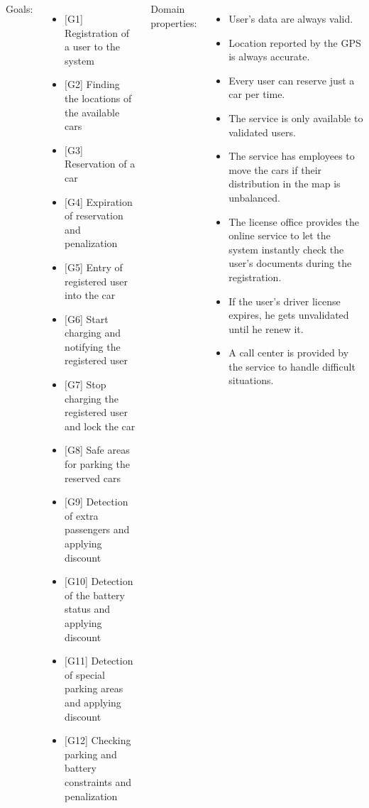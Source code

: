\begin{frame}
	\fontsize{7.5}{9}
	\begin{columns}[c]
		Goals:
		\begin{itemize}
			\item \([\)G1] Registration of a user to the system
			\item \([\)G2] Finding the locations of the available cars
			\item \([\)G3] Reservation of a car
			\item \([\)G4] Expiration of reservation and penalization
			\item \([\)G5] Entry of registered user into the car
			\item \([\)G6] Start charging and notifying the registered user
			\item \([\)G7] Stop charging the registered user and lock the car
			\item \([\)G8] Safe areas for parking the reserved cars
			\item \([\)G9] Detection of extra passengers and applying discount
			\item \([\)G10] Detection of the battery status and applying discount
			\item \([\)G11] Detection of special parking areas and applying discount
			\item \([\)G12] Checking parking and battery constraints and penalization
		\end{itemize}
	
		Domain properties:
		\begin{itemize}
			\item User's data are always valid.
			\item Location reported by the GPS is always accurate.
			\item Every user can reserve just a car per time.
			\item The service is only available to validated users.
			\item The service has employees to move the cars if their distribution in the map is unbalanced.
			\item The license office provides the online service to let the system instantly check the user's documents during the registration.
			\item If the user's driver license expires, he gets unvalidated until he renew it.
			\item A call center is provided by the service to handle difficult situations.
		\end{itemize}
	\end{columns}
\end{frame}

